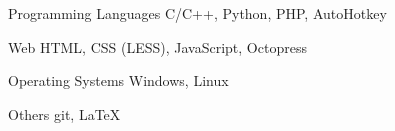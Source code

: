 \cventry{}
    {Programming Languages}
    {}
    {C/C++, Python, PHP, AutoHotkey}
    {}
    {}

\cventry{}
    {Web}
    {}
    {HTML, CSS (LESS), JavaScript, Octopress}
    {}
    {}

\cventry{}
    {Operating Systems}
    {}
    {Windows, Linux}
    {}
    {}

\cventry{}
    {Others}
    {}
    {git, \LaTeX}
    {}
    {}
